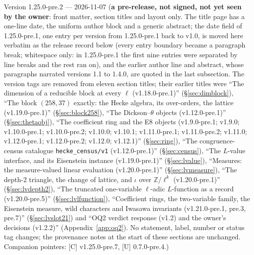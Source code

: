 \documentclass[11pt]{article}
\theoremstyle{remark}
\newcommand{\Z}{\mathbb{Z}}
\begin{document}
Version 1.25.0-pre.2 --- 2026-11-07 (\textbf{a pre-release, not signed, not yet seen by the owner}: front matter, section titles and layout only. The title page has a one-line date, the uniform author block and a generic abstract; the date field of 1.25.0-pre.1, one entry per version from 1.25.0-pre.1 back to v1.0, is moved here verbatim as the release record below (every entry boundary became a paragraph break; whitespace only: in 1.25.0-pre.1 the first nine entries were separated by line breaks and the rest ran on), and the earlier author line and abstract, whose paragraphs narrated versions 1.1 to 1.4.0, are quoted in the last subsection. The version tags are removed from eleven section titles; their earlier titles were ``The dimension of a reducible block at every \texorpdfstring{$\ell$}{l} (v1.18.0-pre.1)'' (\S\ref{sec:dimblock}), ``The block \texorpdfstring{$(258,37)$}{(258,37)} exactly: the Hecke algebra, its over-orders, the lattice (v1.19.0-pre.1)'' (\S\ref{sec:block258}), ``The Dickson--\texorpdfstring{$\theta$}{theta} objects (v1.12.0-pre.1)'' (\S\ref{sec:thetaobj}), ``The coefficient ring and the E8 objects (v1.9.0-pre.1; v1.9.0; v1.10.0-pre.1; v1.10.0-pre.2; v1.10.0; v1.10.1; v1.11.0-pre.1; v1.11.0-pre.2; v1.11.0; v1.12.0-pre.1; v1.12.0-pre.2; v1.12.0; v1.12.1)'' (\S\ref{sec:ring}), ``The congruence-census catalogue \texttt{hecke\_census/v1} (v1.12.0-pre.1)'' (\S\ref{sec:census}), ``The \texorpdfstring{$L$}{L}-value interface, and its Eisenstein instance (v1.19.0-pre.1)'' (\S\ref{sec:lvalue}), ``Measures: the measure-valued \textsf{linear} evaluation (v1.20.0-pre.1)'' (\S\ref{sec:lvmeasure}), ``The depth-2 triangle, the change of lattice, and \texorpdfstring{$\iota$}{iota} over \texorpdfstring{$\Z/\ell^{k}$}{Z/l\^{}k} (v1.20.0-pre.1)'' (\S\ref{sec:lvdepth2}), ``The truncated one-variable \texorpdfstring{$\ell$}{l}-adic \texorpdfstring{$L$}{L}-function as a record (v1.20.0-pre.5)'' (\S\ref{sec:lvlfunction}), ``Coefficient rings, the two-variable family, the Eisenstein measure, wild characters and Iwasawa invariants (v1.21.0-pre.1, pre.3, pre.7)'' (\S\ref{sec:lvslot21}) and ``OQ2 verdict response (v1.2) and the owner's decisions (v1.2.2)'' (Appendix~\ref{app:oq2}). No statement, label, number or status tag changes; the provenance notes at the start of these sections are unchanged. Companion pointers: [C] v1.25.0-pre.7, [U] 0.7.0-pre.4.)
\end{document}
